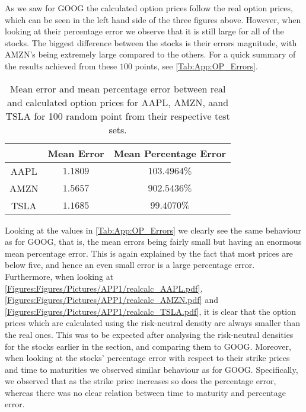 \vspace{-1.5em}\vspace{-2.5em}
\vspace{-2.5em}
\vspace{-0.5em}

As we saw for GOOG the calculated
option prices follow the real option prices, which can be seen in the left hand side of the three figures above. However, when looking at their percentage error we observe that it is still large for all of the stocks. The biggest difference between the stocks is their errors magnitude, with AMZN's being extremely large compared to the others. For a quick summary of the results achieved from these $100$ points, see \autoref{Tab:App:OP_Errors}.

\begin{table}[H]
     \centering
     \begin{tabular}{c|cc}
               & Mean Error & Mean Percentage Error \\ \hline
          AAPL & $1.1809$ & $103.4964\%$ \\
          AMZN & $1.5657$ & $902.5436\%$ \\
          TSLA & $1.1685$ & $99.4070\%$
     \end{tabular}
     \caption{Mean error and mean percentage error between real and calculated option prices for AAPL, AMZN, aand TSLA for 100 random point from their respective test sets.}
     \label{Tab:App:OP_Errors}
 \end{table}

Looking at the values in \autoref{Tab:App:OP_Errors} we clearly see the same behaviour as for GOOG, that is, the mean errors being fairly small but having an enormous mean percentage error. This is again explained by the fact that most prices are below five, and hence an even small error is a large percentage error. Furthermore, when looking at \autoref{Figures:Figures/Pictures/APP1/realcalc_AAPL.pdf}, \autoref{Figures:Figures/Pictures/APP1/realcalc_AMZN.pdf} and \autoref{Figures:Figures/Pictures/APP1/realcalc_TSLA.pdf}, it is clear that the option prices which are calculated using the risk-neutral density are always smaller than the real ones. This was to be expected after analysing the risk-neutral densities for the stocks earlier in the section, and comparing them to GOOG. Moreover, when looking at the stocks' percentage error with respect to their strike prices and time to maturities we observed similar behaviour as for GOOG. Specifically, we observed that as the strike price increases so does the percentage error, whereas there was no clear relation between time to maturity and percentage error.

